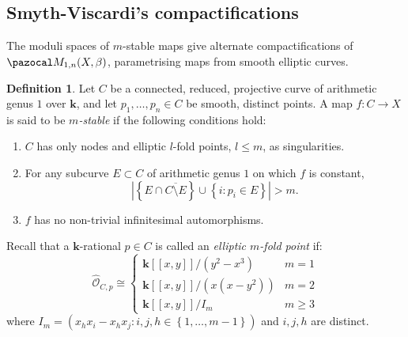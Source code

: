 \documentclass[11pt]{amsart}
\renewcommand{\k}{\mathbf k}
\renewcommand{\to}{\rightarrow}
\theoremstyle{plain}
\theoremstyle{definition}
\newtheorem{dfn}[thm]{Definition}
\begin{document}
\subsection{Smyth-Viscardi's compactifications}
 The moduli spaces of $m$-stable maps give alternate compactifications of $\pazocal M_{1,n}(X,\beta)$, parametrising maps from smooth elliptic curves.
\begin{dfn} Let $C$ be a connected, reduced, projective curve of arithmetic genus $1$ over $\k$, and let $p_1,\dots,p_n\in C$ be smooth, distinct points. A map $f\colon C\to X$ is said to be \emph{$m$-stable} if the following conditions hold:
\begin{enumerate}
 \item $C$ has only nodes and elliptic $l$-fold points, $l\leq m$, as singularities.
 \item For any subcurve $E\subset C$ of arithmetic genus $1$ on which $f$ is constant, 
 \[\left|\left\{E\cap \overline{C\setminus E}\right\}\cup\left\{i : p_i \in E\right\}\right| > m.\]
 \item $f$ has no non-trivial infinitesimal automorphisms.
 \end{enumerate}
\end{dfn}
Recall that a $\k$-rational $p\in C$ is called an \emph{elliptic $m$-fold point} if:
\[
\hat{\mathcal{O}}_{C,p}\cong
\begin{cases}
\k[[x,y]]/(y^2-x^3) &  m=1\\
\k[[x,y]]/(x(x-y^2))&  m=2\\
\k[[x,y]]/ I_m &  m\geq 3
\end{cases}
\] 
where $I_m=\left(x_hx_i-x_hx_j : i,j,h\in\left\{1,\dots,m-1\right\}\right)$ and $i,j,h$ are distinct.
\end{document}
